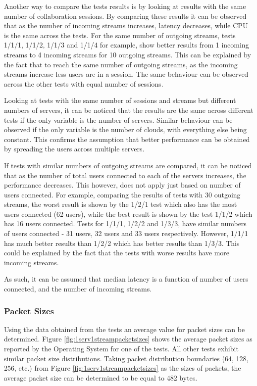 Another way to compare the tests results is by looking at results with the same number of collaboration sessions. By comparing these results it can be observed that as the number of incoming streams increases, latency decreases, while CPU is the same across the tests. For the same number of outgoing streams, tests 1/1/1, 1/1/2, 1/1/3 and 1/1/4 for example, show better results from 1 incoming streams to 4 incoming streams for 10 outgoing streams. This can be explained by the fact that to reach the same number of outgoing streams, as the incoming streams increase less users are in a session. The same behaviour can be observed across the other tests with equal number of sessions.

Looking at tests with the same number of sessions and streams but different numbers of servers, it can be noticed that the results are the same across different tests if the only variable is the number of servers. Similar behaviour can be observed if the only variable is the number of clouds, with everything else being constant. This confirms the assumption that better performance can be obtained by spreading the users across multiple servers.

If tests with similar numbers of outgoing streams are compared, it can be noticed that as the number of total users connected to each of the servers increases, the performance decreases. This however, does not apply just based on number of users connected. For example, comparing the results of tests with 30 outgoing streams, the worst result is shown by the 1/2/1 test which also has the most users connected (62 users), while the best result is shown by the test 1/1/2 which has 16 users connected. Tests for 1/1/1, 1/2/2 and 1/3/3, have similar numbers of users connected - 31 users, 32 users and 33 users respectively. However, 1/1/1 has much better results than 1/2/2 which has better results than 1/3/3. This could be explained by the fact that the tests with worse results have more incoming streams.

As such, it can be assumed that median latency is a function of number of users connected, and the number of incoming streams.

\subsubsection{Packet Sizes}

Using the data obtained from the tests an average value for packet sizes can be determined. Figure \ref{fig:1serv1streampacketsizes} shows the average packet sizes as reported by the Operating System for one of the tests. All other tests exhibit similar packet size distributions. Taking packet distribution boundaries (64, 128, 256, etc.) from Figure \ref{fig:1serv1streampacketsizes} as the sizes of packets, the average packet size can be determined to be equal to 482 bytes.

